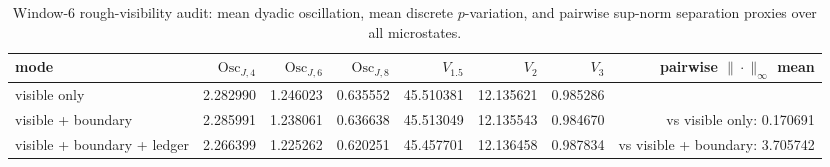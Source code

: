 \begin{table}[H]
\centering
\scriptsize
\setlength{\tabcolsep}{5pt}
\caption{Window-6 rough-visibility audit: mean dyadic oscillation, mean discrete $p$-variation, and pairwise sup-norm separation proxies over all microstates.}
\label{tab:window6_rough_visibility_audit}
\begin{tabular}{l r r r r r r r}
\toprule
mode & $\mathrm{Osc}_{J,4}$ & $\mathrm{Osc}_{J,6}$ & $\mathrm{Osc}_{J,8}$ & $V_{1.5}$ & $V_{2}$ & $V_{3}$ & pairwise $\|\cdot\|_\infty$ mean\\
\midrule
visible only & 2.282990 & 1.246023 & 0.635552 & 45.510381 & 12.135621 & 0.985286 & \\
visible + boundary & 2.285991 & 1.238061 & 0.636638 & 45.513049 & 12.135543 & 0.984670 & vs visible only: 0.170691\\
visible + boundary + ledger & 2.266399 & 1.225262 & 0.620251 & 45.457701 & 12.136458 & 0.987834 & vs visible + boundary: 3.705742\\
\bottomrule
\end{tabular}
\end{table}
